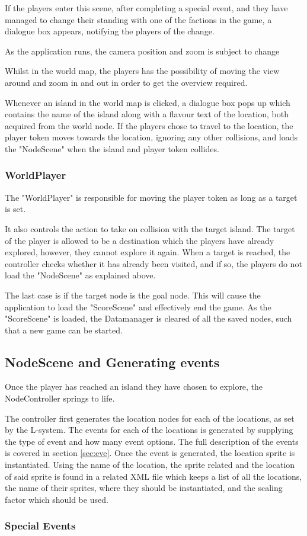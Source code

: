 If the players enter this scene, after completing a special event, and they have managed to change their standing with one of the factions in the game, a dialogue box appears, notifying the players of the change.

As the application runs, the camera position and zoom is subject to change 

Whilst in the world map, the players has the possibility of moving the view around and zoom in and out in order to get the overview required.

Whenever an island in the world map is clicked, a dialogue box pops up which contains the name of the island along with a flavour text of the location, both acquired from the world node. 
If the players chose to travel to the location, the player token moves towards the location, ignoring any other collisions, and loads the "NodeScene" when the island and player token collides. 

\subsubsection{WorldPlayer}
The "WorldPlayer" is responsible for moving the player token as long as a target is set. 

It also controls the action to take on collision with the target island. The target of the player is allowed to be a destination which the players have already explored, however, they cannot explore it again. When a target is reached, the controller checks whether it has already been visited, and if so, the players do not load the "NodeScene" as explained above.

The last case is if the target node is the goal node. This will cause the application to load the "ScoreScene" and effectively end the game.
As the "ScoreScene" is loaded, the Datamanager is cleared of all the saved nodes, such that a new game can be started.

\subsection{NodeScene and Generating events}
Once the player has reached an island they have chosen to explore, the NodeController springs to life. 

The controller first generates the location nodes for each of the locations, as set by the L-system.
The events for each of the locations is generated by supplying the type of event and how many event options. The full description of the events is covered in section \ref{sec:eve}.
Once the event is generated, the location sprite is instantiated. Using the name of the location, the sprite related and the location of said sprite is found in a related XML file which keeps a list of all the locations, the name of their sprites, where they should be instantiated, and the scaling factor which should be used.

\subsubsection{Special Events}